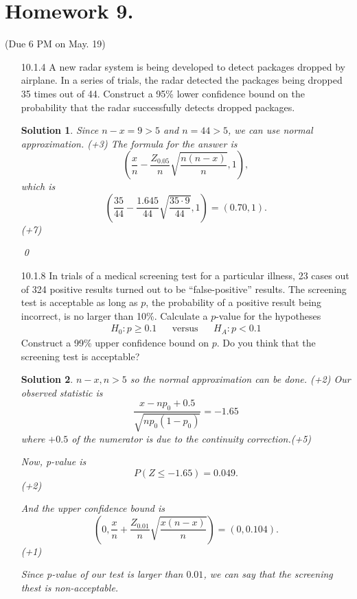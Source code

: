 \documentclass[a4paper,10pt]{article}
\newtheorem*{sol}{Solution}
\begin{document}
\section*{Homework 9.}
(Due 6 PM on May. 19)

\begin{itemize}
\item [10.1.4]  A new radar system is being developed to detect packages
dropped by airplane. In a series of trials, the radar
detected the packages being dropped 35 times out of 44. Construct a 95\% lower confidence bound on the
probability that the radar successfully detects dropped
packages. \\

\begin{sol}
	Since $n-x = 9  > 5$ and $n = 44 > 5$, we can use normal approximation. (+3)
	The formula for the answer is
	\[
		\left (\frac{x}{n} - \frac{Z_{0.05}}{n}\sqrt{ \frac{n(n-x)}{n}}, 1 \right ),
	\]
	which is
	\[
		\left( \frac{35}{44} - \frac{1.645}{44}\sqrt{\frac{35 \cdot 9}{44}}, 1 \right) = (0.70, 1).
	\](+7)

	\qed
\end{sol}

\item [10.1.8] In trials of a medical screening test for a particular
illness, 23 cases out of 324 positive results turned out to
be ``false-positive'' results. The screening test is
acceptable as long as $p$, the probability of a positive
result being incorrect, is no larger than 10\%. Calculate a
$p$-value for the hypotheses
\begin{align*}
	&&H_{0}: p \geq 0.1 && \text{versus}&& H_{A}:p<0.1&&
\end{align*}
Construct a 99\% upper confidence bound on $p$. Do you
think that the screening test is acceptable?

\begin{sol}
	$n-x, n > 5$ so the normal approximation can be done. (+2)
	Our observed statistic is
	\[
		\frac{x-np_0 + 0.5}{\sqrt{np_0(1-p_0)}} = -1.65
	\]
	where $+0.5$ of the numerator is due to the continuity correction.(+5)

	Now, p-value is
	\[
		P(Z \le -1.65) = 0.049.
	\](+2)

	And the upper confidence bound is
	\[
		\left( 0, \frac{x}{n} + \frac{Z_{0.01}}{n}\sqrt{\frac{x(n-x)}{n}} \right) = (0, 0.104).
	\](+1)

	Since p-value of our test is larger than $0.01$, we can say that the screening thest is non-acceptable.


\end{sol}
\end{itemize}
\end{document}
